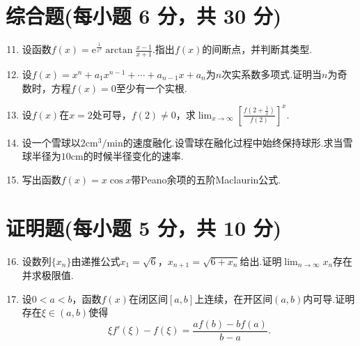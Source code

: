 \documentclass[../main.tex]{subfiles}
\begin{document}
\section{综合题(每小题 6 分，共 30 分)}
\begin{enumerate}
    \setcounter{enumi}{10}
    \item 设函数$f(x)=\mathrm{e}^{\frac{1}{x^{2}}}\arctan\frac{x-1}{x+1}$.指出$f
              (x)$的间断点，并判断其类型.
          \vspace{8em}

    \item 设$f(x)=x^{n}+a_{1} x^{n-1}+\cdots+a_{n-1}x+a_{n}$为$n$次实系数多项式.证明当$n$为奇数时，方程$f
              (x)=0$至少有一个实根.
          \vspace{8em}

    \item 设$f(x)$在$x=2$处可导，$f(2)\neq0$，求$\lim_{x\to\infty}\left[\frac{f\left(2+\frac{1}{x}\right)}{f(2)}
                  \right]^{x}$.
          \vspace{9em}

    \item 设一个雪球以$2\mathrm{cm}^{3}/\mathrm{min}$的速度融化.设雪球在融化过程中始终保持球形.求当雪球半径为$1
              0\mathrm{cm}$的时候半径变化的速率.
          \vspace{10em}

    \item 写出函数$f(x)=x\cos x$带Peano余项的五阶Maclaurin公式.
          \vspace{12em}
\end{enumerate}

\section{证明题(每小题 5 分，共 10 分)}
\begin{enumerate}
    \setcounter{enumi}{15}
    \item 设数列$\{x_{n}\}$由递推公式$x_{1}=\sqrt{6}$，$x_{n+1}=\sqrt{6+x_{n}}$给出.证明$\lim
              _{n\to\infty}x_{n}$存在并求极限值.
          \vspace{12em}

    \item 设$0<a<b$，函数$f(x)$在闭区间$[a,b]$上连续，在开区间$(a,b)$内可导.证明存在$\xi
              \in(a,b)$使得
          \[
              \xi f'(\xi)-f(\xi)=\frac{af(b)-bf(a)}{b-a}.
          \]
\end{enumerate}
\end{document}
